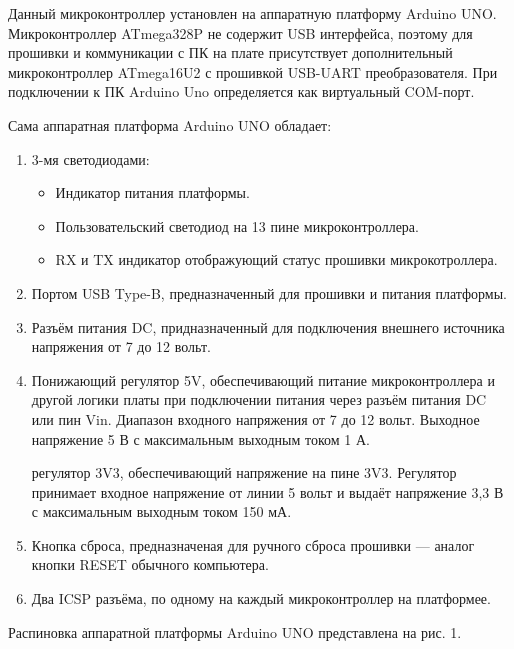 \documentclass[a4paper, 12pt]{article}%
\begin{document}
Данный микроконтроллер установлен на аппаратную платформу Arduino UNO. Микроконтроллер ATmega328P не содержит USB интерфейса, поэтому для прошивки и коммуникации с ПК на плате присутствует дополнительный микроконтроллер ATmega16U2 с прошивкой USB-UART преобразователя. При подключении к ПК Arduino Uno определяется как виртуальный COM-порт.

Сама аппаратная платформа Arduino UNO обладает:
\begin{enumerate}
\item 3-мя светодиодами:

\begin{itemize}
\item Индикатор питания платформы.

\item Пользовательский светодиод на 13 пине микроконтроллера.

\item RX и TX индикатор отображующий статус прошивки микрокотроллера.
\end{itemize}

\item Портом USB Type-B, предназначенный для прошивки и питания платформы.

\item Разъём питания DC, придназначенный для подключения внешнего источника напряжения от 7 до 12 вольт.

\item Понижающий регулятор 5V, обеспечивающий питание микроконтроллера и другой логики платы при подключении питания через разъём питания DC или пин Vin. Диапазон входного напряжения от 7 до 12 вольт. Выходное напряжение 5 В с максимальным выходным током 1 А.

 регулятор 3V3, обеспечивающий напряжение на пине 3V3. Регулятор принимает входное напряжение от линии 5 вольт и выдаёт напряжение 3,3 В с максимальным выходным током 150 мА.

\item Кнопка сброса, предназначеная для ручного сброса прошивки — аналог кнопки RESET обычного компьютера.

\item Два ICSP разъёма, по одному на каждый микроконтроллер на платформее.
\end{enumerate}

Распиновка аппаратной платформы Arduino UNO представлена на рис. 1.

\newpage
\end{document}
